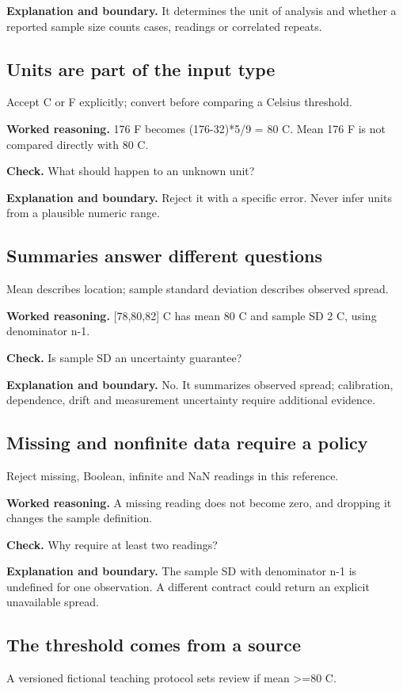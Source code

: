 \textbf{Explanation and boundary.} It determines the unit of analysis and whether a reported sample size counts cases, readings or correlated repeats.

\subsection{Units are part of the input type}
Accept C or F explicitly; convert before comparing a Celsius threshold.

\textbf{Worked reasoning.} 176 F becomes (176-32)*5/9 = 80 C. Mean 176 F is not compared directly with 80 C.

\textbf{Check.} What should happen to an unknown unit?

\textbf{Explanation and boundary.} Reject it with a specific error. Never infer units from a plausible numeric range.

\subsection{Summaries answer different questions}
Mean describes location; sample standard deviation describes observed spread.

\textbf{Worked reasoning.} [78,80,82] C has mean 80 C and sample SD 2 C, using denominator n-1.

\textbf{Check.} Is sample SD an uncertainty guarantee?

\textbf{Explanation and boundary.} No. It summarizes observed spread; calibration, dependence, drift and measurement uncertainty require additional evidence.

\subsection{Missing and nonfinite data require a policy}
Reject missing, Boolean, infinite and NaN readings in this reference.

\textbf{Worked reasoning.} A missing reading does not become zero, and dropping it changes the sample definition.

\textbf{Check.} Why require at least two readings?

\textbf{Explanation and boundary.} The sample SD with denominator n-1 is undefined for one observation. A different contract could return an explicit unavailable spread.

\subsection{The threshold comes from a source}
A versioned fictional teaching protocol sets review if mean >=80 C.

